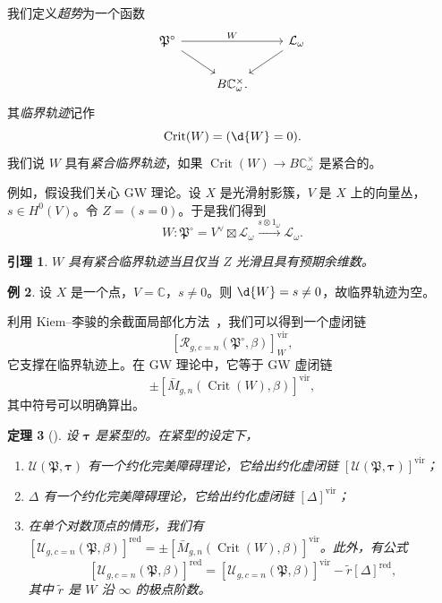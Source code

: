 \documentclass{amsart}
\newtheorem{thm}{定理}[section]
\newtheorem{lem}[thm]{引理}
\theoremstyle{definition}
\newtheorem{exm}[thm]{例}
\theoremstyle{remark}
\theoremstyle{plain}
\theoremstyle{definition}
\theoremstyle{remark}
\newcommand{\C}{\mathbb{C}}
\newcommand{\mc}[1]{\mathcal{#1}}
\newcommand{\mf}[1]{\mathfrak{#1}}
\newcommand{\mr}[1]{\mathrm{#1}}
\newcommand{\on}[1]{\operatorname{#1}}
\newcommand{\1}{\mathbf{1}}
\newcommand{\2}{\mathbf{2}}
\newcommand{\3}{\mathbf{3}}
\newcommand{\vir}{\mr{vir}}
\begin{document}
我们定义\textit{超势}为一个函数
\begin{equation*}
\begin{tikzcd}
    \mf{P}^{\circ} \ar{rr}{W} \ar{dr} && \mc{L}_{\omega} \ar{dl} \\
    & B \C_{\omega}^{\times}.
\end{tikzcd}
\end{equation*}
其\textit{临界轨迹}记作
\[ \on{Crit}(W) = (\d{W} = 0). \]
我们说 \(W\) 具有\textit{紧合临界轨迹}，如果 \(\on{Crit}(W) \to B\C_{\omega}^{\times}\) 是紧合的。

例如，假设我们关心 GW 理论。设 \(X\) 是光滑射影簇，\(V\) 是 \(X\) 上的向量丛，\(s \in H^0(V)\)。令 \(Z = (s = 0)\)。于是我们得到
\[ W \colon \mf{P}^{\circ} = V^{\vee} \boxtimes \mc{L}_{\omega} \xrightarrow{s \otimes 1_{\omega}} \mc{L}_{\omega}. \]

\begin{lem}
    \(W\) 具有紧合临界轨迹当且仅当 \(Z\) 光滑且具有预期余维数。
\end{lem}

\begin{exm}
    设 \(X\) 是一个点，\(V = \C\)，\(s \neq 0\)。则 \(\d{W} = s \neq 0\)，故临界轨迹为空。
\end{exm}

利用 Kiem–李骏的余截面局部化方法~\cite{KiemLi2013}，我们可以得到一个虚闭链
\[ [\mc{R}_{g, c=n}(\mf{P}^{\circ}, \beta)]_W^{\vir}, \]
它支撑在临界轨迹上。在 GW 理论中，它等于 GW 虚闭链
\[ \pm [\bar{M}_{g,n}(\on{Crit}(W), \beta)]^{\vir}, \]
其中符号可以明确算出。

\begin{thm}[{\cite{CJR2021,CJW2021}}]
    设 \(\bm{\tau}\) 是紧型的。在紧型的设定下，
    \begin{enumerate}
        \item \(\mc{U}(\mf{P}, \bm{\tau})\) 有一个约化完美障碍理论，它给出约化虚闭链 \([\mc{U}(\mf{P}, \bm{\tau})]^{\vir}\)；
        \item \(\Delta\) 有一个约化完美障碍理论，它给出约化虚闭链 \([\Delta]^{\vir}\)；
        \item 在单个对数顶点的情形，我们有 \([\mc{U}_{g, c=n}(\mf{P}, \beta)]^{\on{red}} = \pm [\bar{M}_{g,n}(\on{Crit}(W), \beta)]^{\vir}\)。此外，有公式
            \[ [\mc{U}_{g, c=n}(\mf{P}, \beta)]^{\on{red}} = [\mc{U}_{g, c=n}(\mf{P}, \beta)]^{\vir} - \tilde{r} [\Delta]^{\on{red}}, \]
            其中 \(\tilde{r}\) 是 \(W\) 沿 \(\infty\) 的极点阶数。
    \end{enumerate}
\end{thm}
\end{document}
